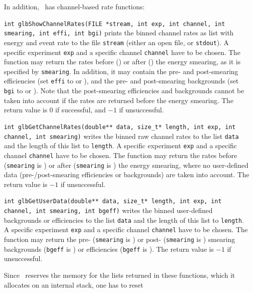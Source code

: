 In addition, \GLOBES\ has channel-based rate functions:
\begin{function}
{\tt int glbShowChannelRates(FILE *stream,
int exp, int channel, int smearing, int effi, int bgi)}
prints the binned channel rates as
list with energy and event rate to the file {\tt stream} (either an
open file, or {\tt stdout}). A specific experiment {\tt exp} and a 
specific channel {\tt channel} have to be chosen.
The function may return
the rates before () or after ()
the energy smearing, as it is specified by {\tt smearing}.
In addition, it may contain the pre- and post-smearing efficiencies (set
{\tt effi} to  or ), and the
pre- and post-smearing backgrounds (set
{\tt bgi} to  or ). Note that
the post-smearing efficiencies and backgrounds cannot be taken into
account if the rates are returned before the energy smearing.
The return value
is $0$ if successful, and $-1$ if unsuccessful.
\end{function}
\begin{function}
{\tt int glbGetChannelRates(double** data,
size\_t* length, int exp, int channel, int smearing)}
writes the binned raw channel rates to the list {\tt data}
and the length of this list to {\tt length}. 
A specific experiment {\tt exp} and a 
specific channel {\tt channel} have to be chosen.
The function may return
the rates before ({\tt smearing} is ) or after ({\tt smearing} is )
the energy smearing, where no user-defined data
(pre-/post-smearing efficiencies or backgrounds) are taken into account.
The return value is $-1$ if unsuccessful.
\end{function}
\begin{function}
{\tt int glbGetUserData(double** data,
size\_t* length, int exp, int channel, int smearing, int bgeff)}
writes the binned user-defined backgrounds or efficiencies 
to the list {\tt data} and the length of this list to {\tt length}. 
A specific experiment {\tt exp} and a 
specific channel {\tt channel} have to be chosen.
The function may return
the pre- ({\tt smearing} is ) or post- ({\tt smearing} is ) smearing backgrounds ({\tt bgeff} is ) 
or efficiencies ({\tt bgeff} is ). 
The return value is $-1$ if unsuccessful.
\end{function}
Since \GLOBES\ reserves the memory for the lists returned in these
functions, which it allocates on an internal stack, one has to reset
